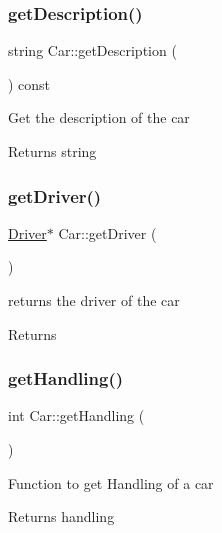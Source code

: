 \subsubsection{\texorpdfstring{get\+Description()}{getDescription()}}
{\footnotesize\ttfamily string Car\+::get\+Description (\begin{DoxyParamCaption}{ }\end{DoxyParamCaption}) const}

Get the description of the car \begin{DoxyReturn}{Returns}
string 
\end{DoxyReturn}
\mbox{\label{class_car_a42b06291391327a61a56ca69dd9951b5}} 
\subsubsection{\texorpdfstring{get\+Driver()}{getDriver()}}
{\footnotesize\ttfamily \mbox{\hyperlink{class_driver}{Driver}}$\ast$ Car\+::get\+Driver (\begin{DoxyParamCaption}{ }\end{DoxyParamCaption})\hspace{0.3cm}{\ttfamily [inline]}}

returns the driver of the car \begin{DoxyReturn}{Returns}

\end{DoxyReturn}
\mbox{\label{class_car_a1ebc0aefed91d874aed3f93789c51209}} 
\subsubsection{\texorpdfstring{get\+Handling()}{getHandling()}}
{\footnotesize\ttfamily int Car\+::get\+Handling (\begin{DoxyParamCaption}{ }\end{DoxyParamCaption})\hspace{0.3cm}{\ttfamily [inline]}}

Function to get Handling of a car \begin{DoxyReturn}{Returns}
handling 
\end{DoxyReturn}
\mbox{\label{class_car_abfcccd0fa3ef14dea58d1a92b9caf62a}} 
